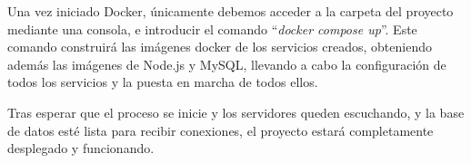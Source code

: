 Una vez iniciado Docker, únicamente debemos acceder a la carpeta del proyecto mediante una consola, e introducir el comando ``\emph{docker compose up}''.
Este comando construirá las imágenes docker de los servicios creados, obteniendo además las imágenes de Node.js y MySQL, llevando a cabo la configuración de todos los servicios y la puesta en marcha de todos ellos.

Tras esperar que el proceso se inicie y los servidores queden escuchando, y la base de datos esté lista para recibir conexiones, el proyecto estará completamente desplegado y funcionando.


  


